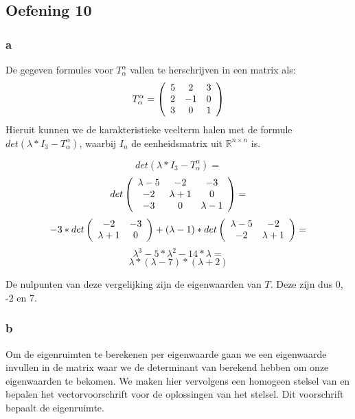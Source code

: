 \documentclass[lineaire_algebra_oplossingen.tex]{subfiles}
\begin{document}
\subsection{Oefening 10}

\subsubsection*{a}
De gegeven formules voor $T^\alpha_\alpha$ vallen te herschrijven in een matrix als:
\[
T^\alpha_\alpha = \left(
\begin{array}{c c c}
5 & 2 & 3 \\
2 & -1 & 0 \\
3 & 0 & 1 \\
\end{array}
\right)
\]
Hieruit kunnen we de karakteristieke veelterm halen met de formule $det(\lambda * I_3 - T^\alpha_\alpha)$, waarbij $I_n$ de eenheidsmatrix uit $\mathbb{R}^{n\times n}$ is.

\[det(\lambda * I_3 - T^\alpha_\alpha)=\]
\[det\left(
\begin{array}{c c c}
\lambda-5 & -2 & -3 \\
-2 & \lambda+1 & 0 \\
-3 & 0 & \lambda-1 \\
\end{array}
\right)=\]
\[-3*det\left(
\begin{array}{c c}
-2 & -3 \\
\lambda+1 & 0 \\
\end{array}
\right) + (\lambda-1)*det\left(
\begin{array}{c c}
\lambda-5 & -2 \\
-2 & \lambda+1 \\
\end{array}
\right)=\]
\[\lambda^3 - 5*\lambda^2 - 14*\lambda=\]
\[\lambda*(\lambda-7)*(\lambda+2)\]

De nulpunten van deze vergelijking zijn de eigenwaarden van $T$. Deze zijn dus 0, -2 en 7.

\subsubsection*{b}

Om de eigenruimten te berekenen per eigenwaarde gaan we een eigenwaarde invullen in de matrix waar we de determinant van berekend hebben om onze eigenwaarden te bekomen. We maken hier vervolgens een homogeen stelsel van en bepalen het vectorvoorschrift voor de oplossingen van het stelsel. Dit voorschrift bepaalt de eigenruimte.\\
\end{document}
